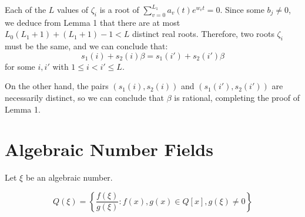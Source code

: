 \documentclass{article}
\newenvironment{proofbox}
  {\begin{mdframed}[linewidth=1pt,linecolor=black,backgroundcolor=white]\noindent\ignorespaces}
  {\end{mdframed}}
\begin{document}
\begin{proofbox}
Each of the $L$ values of $\zeta_i$ is a root of $\sum_{v=0}^{L_1} a_v(t) e^{w_v t} = 0$. Since some $b_j \neq 0$, we deduce from Lemma 1 that there are at most $L_0(L_1 + 1) + (L_1 + 1) - 1 < L$ distinct real roots. Therefore, two roots $\zeta_i$ must be the same, and we can conclude that:
\[
s_1(i) + s_2(i) \beta = s_1(i') + s_2(i') \beta
\]
for some $i, i'$ with $1 \leq i < i' \leq L$.

On the other hand, the pairs $(s_1(i), s_2(i))$ and $(s_1(i'), s_2(i'))$ are necessarily distinct, so we can conclude that $\beta$ is rational, completing the proof of Lemma 1.

\end{proofbox}

\section{Algebraic Number Fields}

Let $\xi$ be an algebraic number. 

$$Q(\xi) = \left \{ \frac{f(\xi)}{g(\xi)} : f(x), g(x) \in Q[x], g(\xi) \neq 0 \right \}$$

\end{document}
